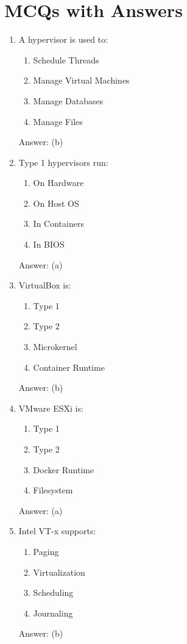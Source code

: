 \section{MCQs with Answers}

\begin{enumerate}

\item A hypervisor is used to:
\begin{enumerate}[label=(\alph*)]
\item Schedule Threads
\item Manage Virtual Machines
\item Manage Databases
\item Manage Files
\end{enumerate}
Answer: (b)

\item Type 1 hypervisors run:
\begin{enumerate}[label=(\alph*)]
\item On Hardware
\item On Host OS
\item In Containers
\item In BIOS
\end{enumerate}
Answer: (a)

\item VirtualBox is:
\begin{enumerate}[label=(\alph*)]
\item Type 1
\item Type 2
\item Microkernel
\item Container Runtime
\end{enumerate}
Answer: (b)

\item VMware ESXi is:
\begin{enumerate}[label=(\alph*)]
\item Type 1
\item Type 2
\item Docker Runtime
\item Filesystem
\end{enumerate}
Answer: (a)

\item Intel VT-x supports:
\begin{enumerate}[label=(\alph*)]
\item Paging
\item Virtualization
\item Scheduling
\item Journaling
\end{enumerate}
Answer: (b)


\end{enumerate}
